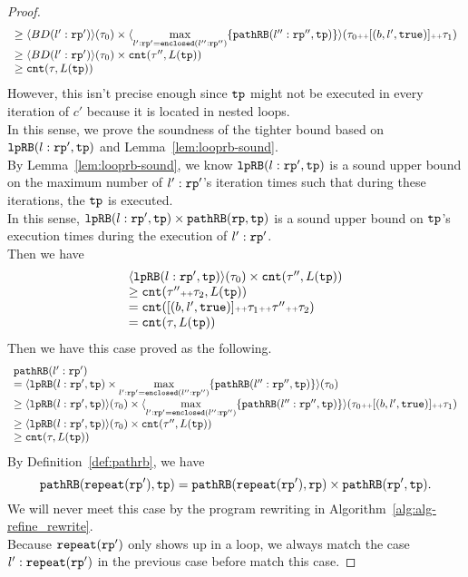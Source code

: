 \begin{proof}
\[\begin{array}{l}
  \geq \langle  BD(l':\mathtt{rp}') \rangle(\mathtt{\tau}_0) \times 
  \langle \max\limits_{l': \mathtt{rp}' = \mathtt{enclosed}(l'':\mathtt{rp}'')} \{\mathtt{pathRB}(l'':\mathtt{rp}'', \mathtt{tp})\} \rangle
  (\mathtt{\tau}_0 {\scriptscriptstyle ++} [(b, l', \mathtt{true})] {\scriptscriptstyle ++} \mathtt{\tau}_1)\\
  \geq \langle  BD(l':\mathtt{rp}') \rangle(\mathtt{\tau}_0) \times \mathtt{cnt}(\mathtt{\tau}'', L(\mathtt{tp})) \\
  \geq \mathtt{cnt}(\mathtt{\tau}, L(\mathtt{tp}))
  \end{array}
\]
However, this isn't precise enough since $\mathtt{tp}$ might not be executed in every iteration of $c'$ because it is located in nested loops. 
\\
In this sense, we prove the soundness of the tighter bound based on $\mathtt{lpRB}(l:\mathtt{rp}', \mathtt{tp})$ and Lemma~\ref{lem:looprb-sound}.
\\
By Lemma~\ref{lem:looprb-sound}, we know $\mathtt{lpRB}(l:\mathtt{rp}', \mathtt{tp})$ is a sound upper bound on the maximum number of $l': \mathtt{rp}'$'s iteration times such that during these iterations, the $\mathtt{tp}$ is executed.
\\
In this sense, $\mathtt{lpRB}(l:\mathtt{rp}', \mathtt{tp}) \times \mathtt{pathRB}(\mathtt{rp}, \mathtt{tp})$ is a sound upper bound on $\mathtt{tp}$'s execution times during the execution of $l': \mathtt{rp}'$.
\\
Then we have
\[
  \begin{array}{l}
  \langle  \mathtt{lpRB}(l:\mathtt{rp}', \mathtt{tp}) \rangle(\mathtt{\tau}_0) \times \mathtt{cnt}(\mathtt{\tau}'', L(\mathtt{tp})) \\
  \geq \mathtt{cnt}(\mathtt{\tau}'' {\scriptscriptstyle ++} \mathtt{\tau}_2, L(\mathtt{tp}))\\
  = \mathtt{cnt}([(b, l', \mathtt{true})] {\scriptscriptstyle ++} \mathtt{\tau}_1 {\scriptscriptstyle ++} \mathtt{\tau}'' {\scriptscriptstyle ++} \mathtt{\tau}_2)\\
  = \mathtt{cnt}(\mathtt{\tau}, L(\mathtt{tp}))
  \end{array}
\]
Then we have this case proved as the following.
\[
  \begin{array}{l}
  \mathtt{pathRB}(l':\mathtt{rp}') \\
  = \langle  \mathtt{lpRB}(l:\mathtt{rp}', \mathtt{tp}) \times \max\limits_{l': \mathtt{rp}' = \mathtt{enclosed}(l'':\mathtt{rp}'')} \{\mathtt{pathRB}(l'':\mathtt{rp}'', \mathtt{tp})\} \rangle(\mathtt{\tau}_0) \\
  \geq \langle  \mathtt{lpRB}(l:\mathtt{rp}', \mathtt{tp})  \rangle(\mathtt{\tau}_0) \times
  \langle \max\limits_{l': \mathtt{rp}' = \mathtt{enclosed}(l'':\mathtt{rp}'')} \{\mathtt{pathRB}(l'':\mathtt{rp}'', \mathtt{tp})\} \rangle 
  (\mathtt{\tau}_0 {\scriptscriptstyle ++} [(b, l', \mathtt{true})] {\scriptscriptstyle ++} \mathtt{\tau}_1) \\
  \geq \langle  \mathtt{lpRB}(l:\mathtt{rp}', \mathtt{tp}) \rangle(\mathtt{\tau}_0) \times \mathtt{cnt}(\mathtt{\tau}'', L(\mathtt{tp})) \\
  \geq \mathtt{cnt}(\mathtt{\tau}, L(\mathtt{tp}))
  \end{array}
\]
%
By Definition~\ref{def:pathrb}, we have
\[
  \mathtt{pathRB}(\mathtt{repeat}(\mathtt{rp}'), \mathtt{tp}) = \mathtt{pathRB}(\mathtt{repeat}(\mathtt{rp}'), \mathtt{rp}) \times \mathtt{pathRB}(\mathtt{rp}', \mathtt{tp}).
\]
We will never meet this case by the program rewriting in Algorithm~\ref{alg:alg-refine_rewrite}.
\\
Because $\mathtt{repeat}(\mathtt{rp}')$ only shows up in a loop, we always match the case $l' : \mathtt{repeat}(\mathtt{rp}')$ in the previous case before match this case.
%
\end{proof}



